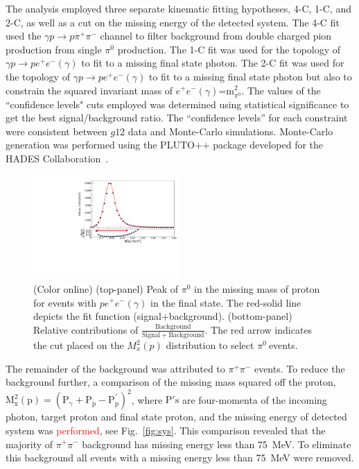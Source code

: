 \documentclass[aps,prc,twocolumn,floatfix,showpacs,preprintnumbers,amsmath,amssymb,superscriptaddress,linenumbers]{revtex4-1}
\def\pizT{$\pi^{0} \ $}
\begin{document}
The analysis employed three separate kinematic fitting 
hypotheses, 4-C, 1-C, and 2-C, as well as a cut on the missing 
energy of the detected system. The 4-C fit used the $\gamma 
p\rightarrow p\pi^+\pi^-$ channel to filter background from double 
charged pion production from single $\pi^0$ production. The 1-C fit
was used for the topology of $\gamma p\rightarrow pe^+e^-(\gamma)$ 
to fit to a missing final state photon.  The 2-C fit was used for 
the topology of $\gamma p\rightarrow pe^+e^-(\gamma)$ to fit to a 
missing final state photon but also to constrain the squared invariant 
mass of $e^+e^-(\gamma)$=m$^2_{\pi^0}$. The values of 
the ``confidence levels" cuts employed was determined using 
statistical significance to get the best signal/background ratio.
 The ``confidence levels'' for each constraint were consistent 
between $g12$ data and Monte-Carlo simulations. 
Monte-Carlo generation was performed using the PLUTO++ package 
developed for the HADES Collaboration~\cite{PLUTO}.
\begin{figure}[htb!]
\centerline{
        \includegraphics[height=0.35\textwidth,width=0.5\textwidth]{G12_Pi0_wBck.pdf}}

        \caption {(Color online) (top-panel) Peak of $\pi^0$ in the missing
        mass of proton for events with $pe^+e^-(\gamma)$ in the final state.
        The red-solid line depicts the fit function (signal+background).
        (bottom-panel) Relative contributions of $\frac{\mathrm{Background}}
        {\mathrm{Signal + Background}}$. The red arrow indicates the cut
        placed on the $M_x^2(p)$ distribution to select \pizT events.}
        \label{fig:pi0_peak}
\end{figure}

The remainder of the background was attributed to $\pi^+\pi^-$
events. To reduce the background further, a comparison of the 
missing mass squared off the proton, $\mathrm{M_x^2(p) =(P_\gamma + P_p -P^{'}_p)^2}$, where $\mathrm{P's}$ are four-momenta of the incoming photon, target proton and final state proton, and the missing energy of detected system was \textcolor{red}{performed}, see Fig.~\ref{fig:sys}. This 
comparison revealed that the majority of $\pi^+\pi^-$ background 
has missing energy less than 75~MeV. To eliminate this background 
all events with a missing energy less than 75~MeV were removed.
\end{document}
